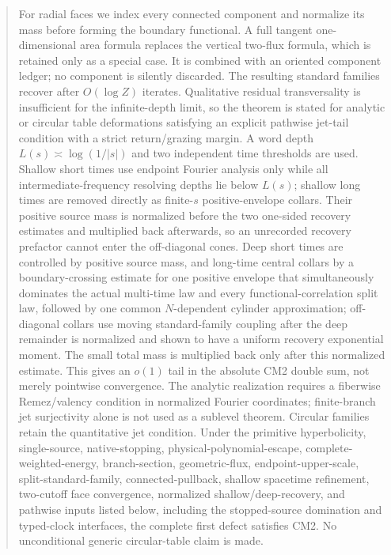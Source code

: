 \documentclass[11pt]{article}
\begin{document}
\begin{abstract}
For radial faces we index every connected component and normalize its mass
before forming the boundary functional.  A full tangent one-dimensional area
formula replaces the vertical two-flux formula, which is retained only as a
special case.  It is combined with an oriented component ledger; no component is silently
discarded.  The resulting standard families recover after $O(\log Z)$
iterates.  Qualitative residual transversality is insufficient for the
infinite-depth limit, so the theorem is stated for analytic or circular table
deformations satisfying an explicit pathwise jet-tail condition with a
strict return/grazing margin.  A word depth $L(s)\asymp\log(1/|s|)$ and two
independent time thresholds are used.  Shallow short times use endpoint
Fourier analysis only while all intermediate-frequency resolving depths lie
below $L(s)$; shallow long times are removed directly as finite-$s$
positive-envelope collars.  Their positive source mass is normalized before
the two one-sided recovery estimates and multiplied back afterwards, so an
unrecorded recovery prefactor cannot enter the off-diagonal cones.
Deep short times are controlled by positive source mass, and long-time
central collars by a boundary-crossing estimate for
one positive envelope that simultaneously dominates the actual multi-time law
and every functional-correlation split law, followed by one common
$N$-dependent cylinder approximation;
off-diagonal collars use moving standard-family coupling after the deep
remainder is normalized and shown to have a uniform recovery exponential
moment.  The small total mass is multiplied back only after this normalized
estimate.  This gives an
$o(1)$ tail in the absolute CM2 double sum, not merely pointwise convergence.
The analytic realization requires a fiberwise Remez/valency condition in
normalized Fourier coordinates; finite-branch jet surjectivity alone is not
used as a sublevel theorem.  Circular families retain the quantitative jet
condition.  Under the primitive hyperbolicity, single-source,
native-stopping, physical-polynomial-escape, complete-weighted-energy,
branch-section, geometric-flux, endpoint-upper-scale, split-standard-family,
connected-pullback, shallow spacetime refinement, two-cutoff face convergence,
normalized shallow/deep-recovery, and pathwise inputs
listed below, including the stopped-source domination and typed-clock
interfaces, the complete first
defect satisfies CM2.  No unconditional generic circular-table claim is made.

\end{abstract}
\end{document}
